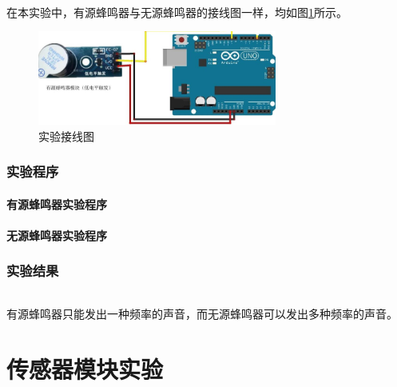 \documentclass[UTF8, oneside]{ctexbook}
\begin{document}
\paragraph{}
在本实验中，有源蜂鸣器与无源蜂鸣器的接线图一样，均如图\ref{b8_line}所示。
\begin{figure}[h]
    \centering
    \includegraphics[width=0.7\textwidth]{./result/basic/8/lines.png}
    \caption{实验接线图}
    \label{b8_line}
\end{figure}

\section{实验程序}
\subsection{有源蜂鸣器实验程序}

\subsection{无源蜂鸣器实验程序}


\section{实验结果}
\paragraph{}
有源蜂鸣器只能发出一种频率的声音，而无源蜂鸣器可以发出多种频率的声音。

\part{传感器模块实验}
\end{document}
